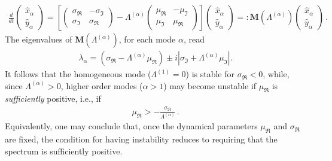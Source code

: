 \documentclass[aps,showpacs,preprintnumbers,amsmath,amssymb,twocolumn,superscriptaddress,floatfix,nofootinbib,10pt,pre]{revtex4-1}
\begin{document}
\begin{align}
    \frac{d}{dt}\begin{pmatrix}
        \hat{x}_\alpha \\ \hat{y}_\alpha
\end{pmatrix} = \left[\begin{pmatrix}
 \sigma_{\Re} & -\sigma_{\Im}\\
 \sigma_{\Im} & \sigma_{\Re}
\end{pmatrix}-\Lambda^{(\alpha)}\begin{pmatrix}
 \mu_{\Re} & -\mu_{\Im}\\
 \mu_{\Im} & \mu_{\Re}
\end{pmatrix}\right]\begin{pmatrix}
        \hat{x}_\alpha \\ \hat{y}_\alpha
\end{pmatrix}=:\mathbf{M}(\Lambda^{(\alpha)})\begin{pmatrix}
        \hat{x}_\alpha \\ \hat{y}_\alpha
\end{pmatrix}\, .
\end{align}
The eigenvalues of $\mathbf{M}(\Lambda^{(\alpha)})$, for each mode $\alpha$, read
\begin{align}
    \lambda_\alpha=(\sigma_{\Re}-\Lambda^{(\alpha)}\mu_{\Re}) \pm i|\sigma_{\Im}+\Lambda^{(\alpha)}\mu_{\Im}|.
\end{align}
It follows that the homogeneous mode ($\Lambda^{(1)} = 0$) is stable for $\sigma_{\Re}<0$, while, since $\Lambda^{(\alpha)} > 0$, higher order modes ($\alpha>1$) may become unstable if $\mu_{\Re}$ is \textit{sufficiently} positive, i.e., if
\begin{align}
\mu_{\Re} > - \frac{\sigma_{\Re}}{\Lambda^{(\alpha)}}\, .
\end{align}  
Equivalently, one may conclude that, once the dynamical parameters $\mu_{\Re}$ and $\sigma_{\Re}$ are fixed, the condition for having instability reduces to requiring that the spectrum is sufficiently positive.
\end{document}
